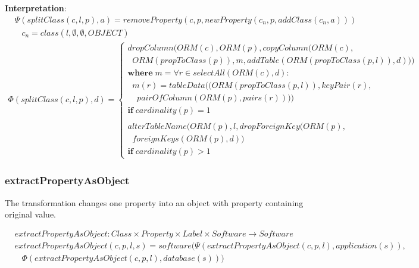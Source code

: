 \documentclass[10pt]{article}
\begin{document}
\noindent \textbf{Interpretation}:
\begin{align}
& \Psi(splitClass(c, l, p), a) =
removeProperty(c, p, newProperty(c_n, p,  addClass(c_n, a))) \nonumber \\
& \;\;\; c_n = class(l, \emptyset, \emptyset, OBJECT)
\end{align}
\begin{align}
\Phi(splitClass(c, l, p), d) = \begin{cases}
dropColumn(ORM(c), ORM(p), copyColumn(ORM(c), \\  \;\; ORM(propToClass(p)), m, addTable(ORM(propToClass(p, l)), d)))\\
\mathbf{where} \; m = \forall r \in selectAll(ORM(c), d) : \\  \;\; m(r) = tableData((ORM(propToClass(p, l)), keyPair(r), \\  \;\;\;\; pairOfColumn(ORM(p), pairs(r)))) \\ 
  \mathbf{if} \; cardinality(p) = 1   \\\\
alterTableName(ORM(p), l, dropForeignKey(ORM(p), \\ \;\; foreignKeys(ORM(p), d)) \\ 
  \mathbf{if} \; cardinality(p) > 1  
 \end{cases}
\end{align}

\subsubsection{extractPropertyAsObject}
The transformation changes one property into an object with property containing original value.

\begin{align}
& extractPropertyAsObject: Class \times Property \times Label \times Software \rightarrow Software \nonumber \\
& extractPropertyAsObject(c, p, l, s) = 
 software(\Psi(extractPropertyAsObject(c, p, l), application(s)), \nonumber \\
 & \;\;\; \Phi(extractPropertyAsObject(c, p, l), database(s)))
\end{align}
\end{document}
